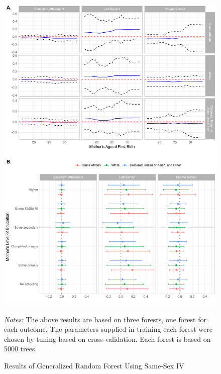 \documentclass[11pt,a4paper]{article}
\newcommand\fnote[1]{\captionsetup{font=footnotesize}\caption*{#1}}
\begin{document}
\begin{figure}[h!]
\centering
\caption{\label{fig:07}Results of Generalized Random Forest Using Same-Sex IV}
\includegraphics[width=\textwidth]{figures/heter2.pdf}
\fnote{\textit{Notes:} The above results are based on three forests, one forest for each outcome. The parameters supplied in training each forest were chosen by tuning based on cross-validation. Each forest is based on 5000 trees. }
\end{figure}




 

\end{document}

